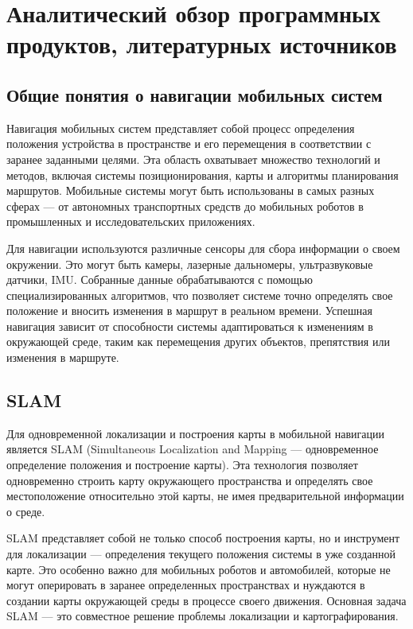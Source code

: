 \section{Аналитический обзор программных продуктов, литературных источников}

\subsection{Общие понятия о навигации мобильных систем}

Навигация мобильных систем представляет собой процесс определения положения
устройства в пространстве и его перемещения в соответствии с заранее заданными
целями. Эта область охватывает множество технологий и методов, включая системы
позиционирования, карты и алгоритмы планирования маршрутов. Мобильные системы
могут быть использованы в самых разных сферах — от автономных транспортных
средств до мобильных роботов в промышленных и исследовательских приложениях.

Для навигации используются различные сенсоры для сбора информации о
своем окружении. Это могут быть камеры, лазерные дальномеры, ультразвуковые
датчики, IMU. Собранные данные обрабатываются с помощью
специализированных алгоритмов, что позволяет системе точно определять свое
положение и вносить изменения в маршрут в реальном времени. Успешная навигация
зависит от способности системы адаптироваться к изменениям в окружающей среде,
таким как перемещения других объектов, препятствия или изменения в маршруте.

\subsection{SLAM}

Для одновременной локализации и построения карты в мобильной навигации является
SLAM (Simultaneous Localization and Mapping — одновременное определение
положения и построение карты). Эта технология позволяет одновременно строить
карту окружающего пространства и определять свое местоположение относительно
этой карты, не имея предварительной информации о среде.

SLAM представляет собой не только способ построения карты, но и инструмент для
локализации — определения текущего положения системы в уже созданной карте. Это
особенно важно для мобильных роботов и автомобилей, которые не могут оперировать
в заранее определенных пространствах и нуждаются в создании карты окружающей
среды в процессе своего движения. Основная задача SLAM — это совместное решение
проблемы локализации и картографирования.

